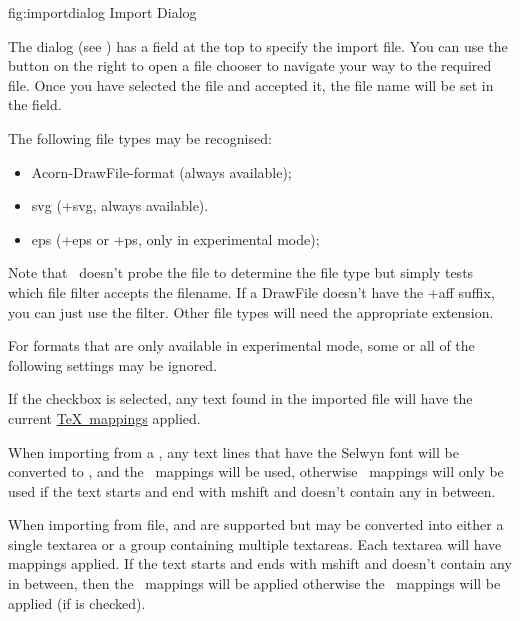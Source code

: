 
\FloatFig
  {fig:importdialog}
  {}
  {Import Dialog}

The  dialog (see ) has a
field at the top to specify the import file. You can use the
 button on the right to open a file chooser to
navigate your way to the required file. Once you have selected the
file and accepted it, the file name will be set in the
 field.

The following file types may be recognised:
\begin{itemize}
\item \gls{Acorn-DrawFile-format} (always available);
\item \gls{svg} (\ext+{svg}, always available).
\item \gls{eps} (\ext+{eps} or \ext+{ps}, only in experimental mode);
\end{itemize}
Note that \FlowframTk\ doesn't probe the file to determine the file
type but simply tests which file filter accepts the filename. 
If a DrawFile doesn't have the \ext+{aff} suffix, you can just use
the  filter. Other file types will need the
appropriate extension.

\begin{information}
For formats that are only available in experimental mode,
some or all of the following settings may be ignored.
\end{information}


If the  checkbox is selected, any text
found in the imported file will have the current
\hyperref[mi:texmappings]{\TeX\ mappings}
applied.

When importing from a , any
text lines that have the Selwyn font will be converted to
\mathsmode, and the \mathsmode\ mappings will be used, otherwise
\mathsmode\ mappings will only be used if the text starts and end
with \gls{mshift} and doesn't contain any  in between.

When importing from  file,  and 
are supported but may be converted into either a single
\gls{textarea} or a \gls{group} containing multiple
\glspl{textarea}. Each \gls{textarea} will have mappings
applied. If the text starts and ends with \gls{mshift} and doesn't
contain any  in between, then the \mathsmode\
mappings will be applied otherwise the \textmode\ mappings will be
applied (if \widget{import.use_mappings} is checked).

